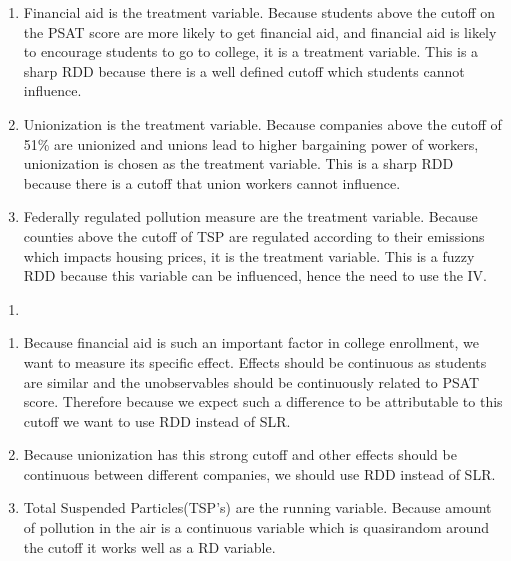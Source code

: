\documentclass[
  12pt,
  landscape]{article}
\begin{document}
\begin{enumerate}
\def\labelenumi{\roman{enumi})}
\item
  Financial aid is the treatment variable. Because students above the
  cutoff on the PSAT score are more likely to get financial aid, and
  financial aid is likely to encourage students to go to college, it is
  a treatment variable. This is a sharp RDD because there is a well
  defined cutoff which students cannot influence.
\item
  Unionization is the treatment variable. Because companies above the
  cutoff of 51\% are unionized and unions lead to higher bargaining
  power of workers, unionization is chosen as the treatment variable.
  This is a sharp RDD because there is a cutoff that union workers
  cannot influence.
\item
  Federally regulated pollution measure are the treatment variable.
  Because counties above the cutoff of TSP are regulated according to
  their emissions which impacts housing prices, it is the treatment
  variable. This is a fuzzy RDD because this variable can be influenced,
  hence the need to use the IV.
\end{enumerate}

\begin{enumerate}
\def\labelenumi{(\alph{enumi})}
\setcounter{enumi}{3}
\item
\end{enumerate}

\begin{enumerate}
\def\labelenumi{\roman{enumi})}
\item
  Because financial aid is such an important factor in college
  enrollment, we want to measure its specific effect. Effects should be
  continuous as students are similar and the unobservables should be
  continuously related to PSAT score. Therefore because we expect such a
  difference to be attributable to this cutoff we want to use RDD
  instead of SLR.
\item
  Because unionization has this strong cutoff and other effects should
  be continuous between different companies, we should use RDD instead
  of SLR.
\item
  Total Suspended Particles(TSP's) are the running variable. Because
  amount of pollution in the air is a continuous variable which is
  quasirandom around the cutoff it works well as a RD variable.
\end{enumerate}
\end{document}
